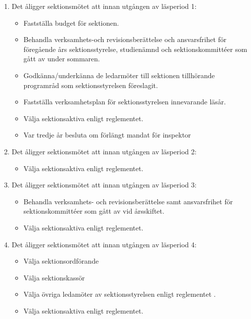 \documentclass[11pt,a4paper]{article}
\begin{document}
\begin{enumerate}[\thesubsection .1]

  \item Det åligger sektionsmötet att innan utgången av läsperiod 1:
    \begin{itemize}
      \item Fastställa budget för sektionen.
      \item Behandla verksamhets-och revisionsberättelse och ansvarsfrihet för
      före\-gående års sektionsstyrelse, studienämnd och sektionskommittéer som gått av under sommaren.
      \item Godkänna/underkänna de ledarmöter till sektionen tillhörande programråd som sektionsstyrelsen föreslagit.
      \item Fastställa verksamhetsplan för sektionsstyrelsen innevarande läsår.
      \item Välja sektionsaktiva enligt reglementet. 
      
      
      \item Var tredje år besluta om förlängt mandat för inspektor
    \end{itemize}

  \item Det åligger sektionsmötet att innan utgången av läsperiod 2:
    \begin{itemize}
      \item Välja sektionsaktiva enligt reglementet.
    \end{itemize}

  \item Det åligger sektionsmötet att innan utgången av läsperiod 3:
    \begin{itemize}
      \item Behandla verksamhets- och revisionsberättelse samt ansvarsfrihet
      för sektionskommittéer som gått av vid årsskiftet.
      \item Välja sektionsaktiva enligt reglementet.
    \end{itemize}

  \item Det åligger sektionsmötet att innan utgången av läsperiod 4:
    \begin{itemize}
    \item Välja sektionsordförande
    \item Välja sektionskassör
      \item Välja övriga ledamöter av sektionsstyrelsen  enligt reglementet .
      \item Välja sektionsaktiva enligt reglementet.
    \end{itemize}

\end{enumerate}
\end{document}
